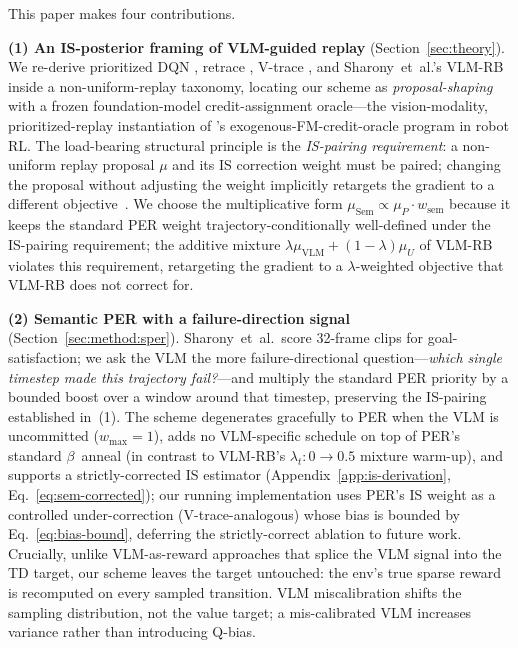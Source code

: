 \documentclass{article}
\begin{document}
This paper makes four contributions.

\textbf{(1) An IS-posterior framing of VLM-guided replay} (Section~\ref{sec:theory}).
We re-derive prioritized DQN \citep{schaul2016per}, retrace \citep{munos2016retrace},
V-trace \citep{espeholt2018impala}, and Sharony~et~al.'s VLM-RB \citep{sharony2026vlmrb}
inside a non-uniform-replay taxonomy, locating our scheme as
\emph{proposal-shaping} with a frozen foundation-model credit-assignment
oracle---the vision-modality, prioritized-replay instantiation of
\citet{pignatelli2024calm}'s exogenous-FM-credit-oracle program in robot RL.
The load-bearing structural principle is the \emph{IS-pairing requirement}: a
non-uniform replay proposal $\mu$ and its IS correction weight must be paired;
changing the proposal without adjusting the weight implicitly retargets the
gradient to a different objective~\citep[Sec.~3.4]{schaul2016per}.
We choose the multiplicative form $\mu_{\text{Sem}}\!\propto\!\mu_P\!\cdot\!w_{\text{sem}}$
because it keeps the standard PER weight trajectory-conditionally well-defined
under the IS-pairing requirement; the additive mixture
$\lambda\mu_{\text{VLM}}\!+\!(1\!-\!\lambda)\mu_U$ of VLM-RB
\citep{sharony2026vlmrb} violates this requirement, retargeting the gradient
to a $\lambda$-weighted objective that VLM-RB does not correct for.

\textbf{(2) Semantic PER with a failure-direction signal}
(Section~\ref{sec:method:sper}). Sharony~et~al.\ score 32-frame clips for
goal-satisfaction; we ask the VLM the more failure-directional
question---\emph{which single timestep made this trajectory fail?}---and
multiply the standard PER priority by a bounded boost over a window around
that timestep, preserving the IS-pairing established in~(1).
The scheme degenerates gracefully to PER when the VLM is
uncommitted ($w_{\max}\!=\!1$), adds no VLM-specific schedule on top of
PER's standard $\beta$~anneal (in contrast to VLM-RB's
$\lambda_t\!:\!0\!\to\!0.5$ mixture warm-up), and supports a
strictly-corrected IS estimator (Appendix~\ref{app:is-derivation},
Eq.~\eqref{eq:sem-corrected}); our running implementation uses PER's IS weight
as a controlled under-correction (V-trace-analogous) whose bias is bounded by
Eq.~\eqref{eq:bias-bound}, deferring the strictly-correct ablation to future work.
Crucially, unlike VLM-as-reward
approaches \citep{rocamonde2024vlmreward,wu2026largerewardmodels,patel2025iker}
that splice the VLM signal into the TD target, our scheme leaves the target
untouched: the env's true sparse reward is recomputed on every sampled
transition. VLM miscalibration shifts the sampling distribution, not the value
target; a mis-calibrated VLM increases variance rather than introducing
Q-bias.
\end{document}
